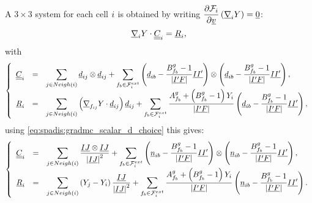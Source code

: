 A $3\times 3$ system for each cell $i$
is obtained by writing  $\dfrac{\partial \mathcal{F}_i}{\partial \underline{v} }
\left( \underline{\nabla}_i Y \right)= \underline{0}$:
%
\begin{equation}\label{eq:spadis:gradmc_matrix}
\underline{\nabla}_i Y \cdot \underline{\underline{C}}_i = \underline{R}_i ,
\end{equation}
with
%
\begin{equation}
\left\{
\begin{array}{r c l}
\underline{\underline{C}}_i &=&
\displaystyle
 \sum\limits_{j \in Neigh\left(i\right) }
 \underline{d}_{ij} \otimes \underline{d}_{ij}
+
\sum\limits_{{f_{b}} \in \mathcal{F}^{ext}_{i}}
\left( \underline{d}_{ib} -\dfrac{ B^g_{f_{b}} -1}{\left| \underline{{I^\prime} F} \right|}  \underline{I {I^\prime} } \right)
\otimes
\left( \underline{d}_{ib} -\dfrac{ B^g_{f_{b}} -1}{\left| \underline{{I^\prime} F} \right|}  \underline{I {I^\prime} } \right),
\\
\underline{R}_i &=&
\displaystyle
\sum\limits_{ j \in Neigh\left(i\right) }
\left( \underline{\nabla}_{{f_{ij}}} Y   \cdot \underline{d}_{ij} \right) \underline{d}_{ij}
+
\sum\limits_{ {f_{b}} \in \mathcal{F}^{ext}_{i}}
\dfrac{
A^g_{f_{b}} +\left(B^g_{f_{b}} -1 \right) Y_i
}{
\left| \underline{{I^\prime} F} \right|
}
\left( \underline{d}_{ib} -  \dfrac{B^g_{f_{b}} -1 }{\left| \underline{{I^\prime} F} \right|} \underline{I {I^\prime}} \right),
\end{array}\right.
\end{equation}
%
using \eqref{eq:spadis:gradmc_scalar_d_choice} this gives:
\begin{equation}
\left\lbrace
\begin{array}{r c l}
\underline{\underline{C}}_i &=&
\displaystyle
 \sum\limits_{j \in Neigh\left(i\right) }
 \dfrac{\underline{I J} \otimes \underline{I J}}{\left| \underline{I J} \right|^2}
 +
\sum\limits_{{f_{b}} \in \mathcal{F}^{ext}_{i}}
\left( \underline{n}_{ib} -\dfrac{ B^g_{f_{b}} -1}{\left| \underline{{I^\prime} F} \right|}  \underline{I {I^\prime} } \right)
\otimes
\left( \underline{n}_{ib} -\dfrac{ B^g_{f_{b}} -1}{\left| \underline{{I^\prime} F} \right|}  \underline{I {I^\prime} } \right),
\\
\underline{R}_i &=&
\displaystyle
\sum\limits_{ j \in Neigh\left(i\right) }
\left( Y_j - Y_i  \right) \dfrac{ \underline{I J}}{\left| \underline{I J} \right|^2}
+
\sum\limits_{ {f_{b}} \in \mathcal{F}^{ext}_{i}}
\dfrac{
A^g_{f_{b}} +\left(B^g_{f_{b}} -1 \right) Y_i
}{
\left| \underline{{I^\prime} F} \right|
}
\left( \underline{n}_{ib} -  \dfrac{B^g_{f_{b}} -1 }{\left| \underline{{I^\prime} F} \right|} \underline{I {I^\prime}} \right).
\end{array}\right.
\end{equation}

